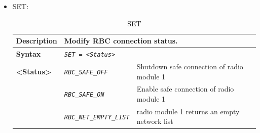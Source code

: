 \documentclass{template/openetcs}
\begin{document}
\begin{itemize}
		\item SET:
							
			\begin{longtable}{|l|l|l|}
				\caption{SET}\\ 
				\hline
				
					\begin{minipage}[t]{0.22\linewidth} \textbf{Description} \end{minipage} 
				&	\multicolumn{2}{l|}{ \begin{minipage}[t]{0.78\linewidth} Modify RBC connection status. \end{minipage} } \\
												
				\hline
								
					\begin{minipage}[t]{0.22\linewidth} \textbf{Syntax}	\end{minipage}
				&	\multicolumn{2}{l|}{ \begin{minipage}[t]{0.78\linewidth} \emph{\texttt{SET = <Status>}}  \end{minipage} } \\
					
				\hline
				
					\multirow{1}{*}{ \begin{minipage}[t]{0.22\linewidth} \textbf{<Status>} \end{minipage} }
				&	\begin{minipage}[t]{0.40\linewidth} \emph{\texttt{RBC\_SAFE\_OFF}} \end{minipage}
				&	\begin{minipage}[t]{0.38\linewidth} Shutdown safe connection of radio module 1 \end{minipage} \\
					
				\hline
				
				&	\begin{minipage}[t]{0.40\linewidth}\emph{\texttt{RBC\_SAFE\_ON}} \end{minipage}
				&	\begin{minipage}[t]{0.38\linewidth} Enable safe connection of radio module 1 \end{minipage} \\
				
				\hline
				
				&	\begin{minipage}[t]{0.40\linewidth} \emph{\texttt{RBC\_NET\_EMPTY\_LIST}} \end{minipage}
				&	\begin{minipage}[t]{0.38\linewidth} radio module 1 returns an empty network list \end{minipage} \\
				

\end{longtable}
\end{itemize}
\end{document}
